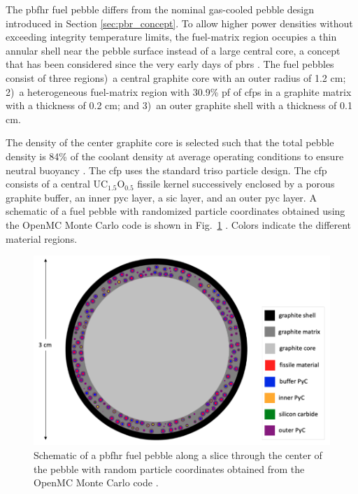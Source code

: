 The \gls{pbfhr} fuel pebble differs from the nominal gas-cooled pebble design introduced in Section \ref{sec:pbr_concept}. To allow higher power densities without exceeding integrity temperature limits, the fuel-matrix region occupies a thin annular shell near the pebble surface instead of a large central core, a concept that has been considered since the very early days of \glspl{pbr} \cite{claxton}. The fuel pebbles consist of three regions)~a central graphite core with an outer radius of 1.2 \si{\centi\meter}; 2)~a heterogeneous fuel-matrix region with 30.9\% \gls{pf} of \glspl{cfp} in a graphite matrix with a thickness of 0.2 \si{\centi\meter}; and 3)~an outer graphite shell with a thickness of 0.1 \si{\centi\meter}. 

The density of the center graphite core is selected such that the total pebble density is 84\% of the coolant density at average operating conditions to ensure neutral buoyancy \cite{fratoni}. The \gls{cfp} uses the standard \gls{triso} particle design. The \gls{cfp} consists of a central UC$_{1.5}$O$_{0.5}$ fissile kernel successively enclosed by a porous graphite buffer, an inner \gls{pyc} layer, a \gls{sic} layer, and an outer \gls{pyc} layer. A schematic of a fuel pebble with randomized particle coordinates obtained using the OpenMC Monte Carlo code is shown in Fig.\ \ref{fig:pbfhr_fuel} \cite{romano}. Colors indicate the different material regions.

\begin{figure}[h!]
\centering
\hspace{1.5cm}
\includegraphics[width=0.6\linewidth]{figs/pbfhr_pebble.png}
\caption{Schematic of a \gls{pbfhr} fuel pebble along a slice through the center of the pebble with random particle coordinates obtained from the OpenMC Monte Carlo code \cite{romano}.}
\label{fig:pbfhr_fuel}
\end{figure}

